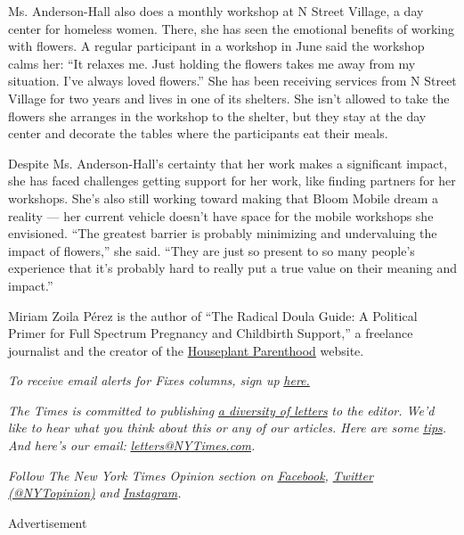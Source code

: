 Ms. Anderson-Hall also does a monthly workshop at N Street Village, a
day center for homeless women. There, she has seen the emotional
benefits of working with flowers. A regular participant in a workshop in
June said the workshop calms her: ``It relaxes me. Just holding the
flowers takes me away from my situation. I've always loved flowers.''
She has been receiving services from N Street Village for two years and
lives in one of its shelters. She isn't allowed to take the flowers she
arranges in the workshop to the shelter, but they stay at the day center
and decorate the tables where the participants eat their meals.

Despite Ms. Anderson-Hall's certainty that her work makes a significant
impact, she has faced challenges getting support for her work, like
finding partners for her workshops. She's also still working toward
making that Bloom Mobile dream a reality --- her current vehicle doesn't
have space for the mobile workshops she envisioned. ``The greatest
barrier is probably minimizing and undervaluing the impact of flowers,''
she said. ``They are just so present to so many people's experience that
it's probably hard to really put a true value on their meaning and
impact.''

Miriam Zoila Pérez is the author of ``The Radical Doula Guide: A
Political Primer for Full Spectrum Pregnancy and Childbirth Support,'' a
freelance journalist and the creator of the
\href{https://houseplantparenthood.com/}{Houseplant Parenthood} website.

\emph{To receive email alerts for Fixes columns, sign up}
\href{http://eepurl.com/ABIxL}{\emph{here.}}

\emph{The Times is committed to publishing}
\href{https://www.nytimes3xbfgragh.onion/2019/01/31/opinion/letters/letters-to-editor-new-york-times-women.html}{\emph{a
diversity of letters}} \emph{to the editor. We'd like to hear what you
think about this or any of our articles. Here are some}
\href{https://help.nytimes3xbfgragh.onion/hc/en-us/articles/115014925288-How-to-submit-a-letter-to-the-editor}{\emph{tips}}\emph{.
And here's our email:}
\href{mailto:letters@NYTimes.com}{\emph{letters@NYTimes.com}}\emph{.}

\emph{Follow The New York Times Opinion section on}
\href{https://www.facebookcorewwwi.onion/nytopinion}{\emph{Facebook}}\emph{,}
\href{http://twitter.com/NYTOpinion}{\emph{Twitter (@NYTopinion)}}
\emph{and}
\href{https://www.instagram.com/nytopinion/}{\emph{Instagram}}\emph{.}

Advertisement

